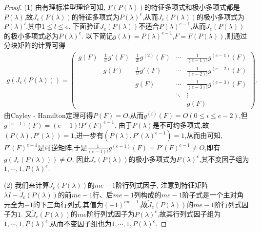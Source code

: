 \documentclass[../../main.tex]{subfiles}%
\begin{document}
\begin{proof}

(1) 由有理标准型理论可知, $F(P(\lambda))$的特征多项式和极小多项式都是$P(\lambda)$,故$J_e(P(\lambda))$的特征多项式为$P(\lambda)^e$,从而$J_e(P(\lambda))$的极小多项式为$P(\lambda)^l$,其中$1\leqslant l\leqslant e$. 下面验证$J_e(P(\lambda))$不适合$P(\lambda)^{e - 1}$,从而$J_e(P(\lambda))$的极小多项式必为$P(\lambda)^e$. 以下简记$g(\lambda)=P(\lambda)^{e - 1}$,$F = F(P(\lambda))$,则通过分块矩阵的计算可得
\begin{align*}
g(J_e(P(\lambda))) = 
\begin{pmatrix}
g(F) & \frac{1}{1!}g'(F) & \frac{1}{2!}g^{(2)}(F) & \cdots & \frac{1}{(e - 1)!}g^{(e - 1)}(F) \\
 & g(F) & \frac{1}{1!}g'(F) & \cdots & \frac{1}{(e - 2)!}g^{(e - 2)}(F) \\
 & & g(F) & \cdots & \frac{1}{(e - 3)!}g^{(e - 3)}(F) \\
 & & & \ddots & \vdots \\
 & & & & g(F)
\end{pmatrix}.
\end{align*}
由Cayley - Hamilton定理可得$P(F)=O$,从而$g^{(i)}(F)=O (0\leqslant i\leqslant e - 2)$,但$g^{(e - 1)}(F)=(e - 1)!P'(F)^{e - 1}$. 由于$P(\lambda)$是不可约多项式,故$(P(\lambda),P'(\lambda)) = 1$,进一步有$(P(\lambda),P'(\lambda)^{e - 1}) = 1$,从而由可知,$P'(F)^{e - 1}$是可逆矩阵,于是$\frac{1}{(e - 1)!}g^{(e - 1)}(F)=P'(F)^{e - 1}\neq O$,即有$g(J_e(P(\lambda)))\neq O$. 因此$J_e(P(\lambda))$的极小多项式为$P(\lambda)^e$,其不变因子组为$1,\cdots,1,P(\lambda)^e$.

(2) 我们来计算$\widetilde{J}_e(P(\lambda))$的$me - 1$阶行列式因子, 注意到特征矩阵$\lambda I-\widetilde{J}_e(P(\lambda))$的前$me - 1$行、后$me - 1$列构成的$me - 1$阶子式是一个主对角元全为$-1$的下三角行列式,其值为$(-1)^{me - 1}$,故$\widetilde{J}_e(P(\lambda))$的$me - 1$阶行列式因子为$1$. 又$\widetilde{J}_e(P(\lambda))$的$me$阶行列式因子为$P(\lambda)^e$,故其行列式因子组为$1,\cdots,1,P(\lambda)^e$,从而不变因子组也为$1,\cdots,1,P(\lambda)^e$.

\end{proof}
\end{document}
